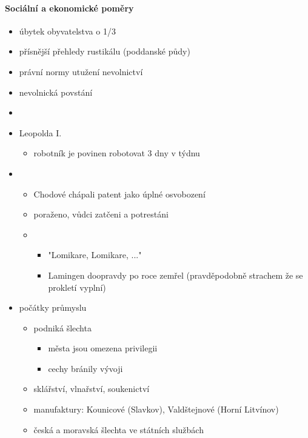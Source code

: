 \paragraph{Sociální a ekonomické poměry}
\begin{itemize}
\item úbytek obyvatelstva o 1/3 
\item přísnější přehledy rustikálu (poddanské půdy)
\item právní normy \ra utužení nevolnictví
\item nevolnická povstání
\item {}
\item {} Leopolda I.
	\begin{itemize}
	\item robotník je povinen robotovat 3 dny v týdnu
	\end{itemize}
\item {}
	\begin{itemize}
	\item Chodové chápali patent jako úplné osvobození
	\item poraženo, vůdci zatčeni a potrestáni
	\item {}
		\begin{itemize}
		\item "Lomikare, Lomikare, ..."
		\item Lamingen doopravdy po roce zemřel (pravděpodobně strachem že se prokletí vyplní)
		\end{itemize}
	\end{itemize}
\item počátky průmyslu
	\begin{itemize}
	\item podniká šlechta 
		\begin{itemize}
		\item města jsou omezena privilegii
		\item cechy bránily vývoji
		\end{itemize}
	\item sklářství, vlnařství, soukenictví
	\item manufaktury: Kounicové (Slavkov), Valdštejnové (Horní Litvínov)
	\item česká a moravská šlechta ve státních službách 
	\end{itemize}
\end{itemize}
